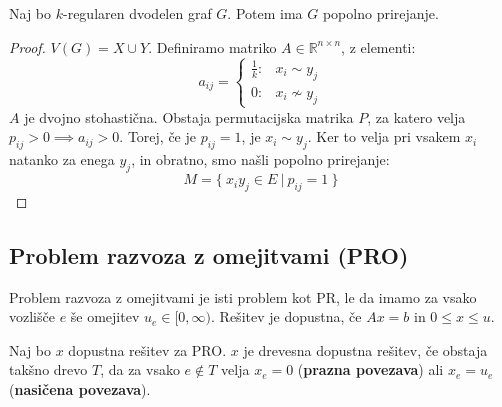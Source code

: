 \documentclass[11pt, a4paper]{article}
\begin{document}
    \begin{theorem}
        Naj bo \(k\)-regularen dvodelen graf \(G\). Potem ima \(G\) popolno prirejanje. 
    \end{theorem}
        
    \begin{proof}
        \(V(G)=X \cup Y\). Definiramo matriko \(A \in \mathbb{R}^{n \times n}\), z elementi:
        \[
            a_{ij}=
            \begin{cases}
                \frac{1}{k}: & x_i \sim y_j \\
                0: & x_i \nsim y_j    
            \end{cases}
        \]
        \(A\) je dvojno stohastična. Obstaja permutacijska matrika \(P\), za katero velja \(p_{ij} > 0 \implies a_{ij} > 0\). Torej, če je \(p_{ij} = 1\), je \(x_i \sim y_j\). Ker to velja pri vsakem \(x_i\) natanko za enega \(y_j\), in obratno, smo našli popolno prirejanje:
        \[
            M = \{\ x_i y_j \in E\ |\ p_{ij}=1\ \}    
        \]
    \end{proof}


    \subsection{Problem razvoza z omejitvami (PRO)}

    Problem razvoza z omejitvami je isti problem kot PR, le da imamo za vsako vozlišče \(e\) še omejitev \(u_e \in [0, \infty)\). Rešitev je dopustna, če \(Ax = b\) in \(0 \le x \le u\).

    \begin{definition}
        Naj bo \(x\) dopustna rešitev za PRO. \(x\) je drevesna dopustna rešitev, če obstaja takšno drevo \(T\), da za vsako \(e \notin T\) velja \(x_e = 0\) (\textbf{prazna povezava}) ali \(x_e = u_e\) (\textbf{nasičena povezava}).
    \end{definition}
\end{document}
